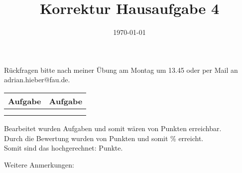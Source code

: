 \documentclass[11pt,a4paper]{article}
\title{Korrektur Hausaufgabe 4}
\date{\today}
\begin{document}
\maketitle

\begin{center}
    Rückfragen bitte nach meiner Übung am Montag um 13.45 oder per Mail an adrian.hieber@fau.de.
\end{center}

\vspace{2cm}

\begin{center}
    \begin{tabular}[h]{l|r}
    Aufgabe\qquad \qquad& Aufgabe\qquad \qquad\\
    \hline
      & \\
      & \\
    \end{tabular}
\end{center}

\vspace{1cm}

\begin{center}
Bearbeitet wurden Aufgaben \qquad \qquad \quad und somit wären \qquad \quad von \qquad \quad Punkten erreichbar.\\
\vspace{0.6cm}
Durch die Bewertung wurden \qquad \quad von \qquad \quad Punkten und somit \qquad \quad\% erreicht.\\
\vspace{0.6cm}
Somit sind das hochgerechnet: \qquad \quad Punkte.\\

\end{center}
\vspace{2cm}

Weitere Anmerkungen:
\end{document}
